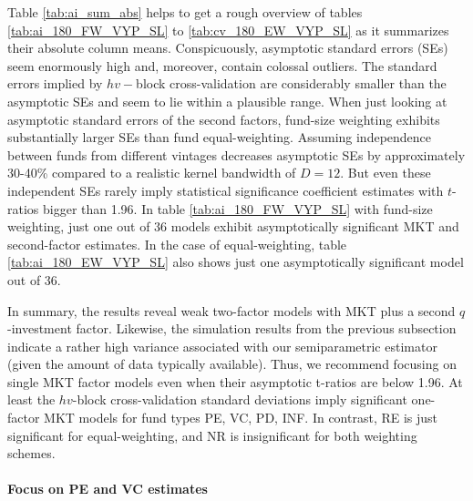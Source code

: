 \documentclass[12pt]{article}
\begin{document}
Table \ref{tab:ai_sum_abs} helps to get a rough overview of tables \ref{tab:ai_180_FW_VYP_SL} to \ref{tab:cv_180_EW_VYP_SL} as it summarizes their absolute column means.
Conspicuously, asymptotic standard errors (SEs) seem enormously high and, moreover, contain colossal outliers.
The standard errors implied by $hv-$block cross-validation are considerably smaller than the asymptotic SEs and seem to lie within a plausible range.
When just looking at asymptotic standard errors of the second factors, fund-size weighting exhibits substantially larger SEs than fund equal-weighting.
Assuming independence between funds from different vintages decreases asymptotic SEs by approximately 30-40\% compared to a realistic kernel bandwidth of $D=12$.
But even these independent SEs rarely imply statistical significance coefficient estimates with $t$-ratios bigger than 1.96.
In table \ref{tab:ai_180_FW_VYP_SL} with fund-size weighting, just one out of 36 models exhibit asymptotically significant MKT and second-factor estimates.
In the case of equal-weighting, table \ref{tab:ai_180_EW_VYP_SL} also shows just one asymptotically significant model out of 36.

In summary, the results reveal weak two-factor models with MKT plus a second $q$-investment factor. 
Likewise, the simulation results from the previous subsection indicate a rather high variance associated with our semiparametric estimator (given the amount of data typically available).
Thus, we recommend focusing on single MKT factor models even when their asymptotic t-ratios are below 1.96.
At least the $hv$-block cross-validation standard deviations imply significant one-factor MKT models for fund types PE, VC, PD, INF.
In contrast, RE is just significant for equal-weighting, and NR is insignificant for both weighting schemes.

\paragraph{Focus on PE and VC estimates}
\end{document}

